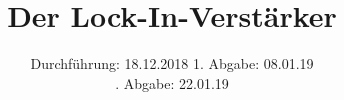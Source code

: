 

\subject{V303}
\title{Der Lock-In-Verstärker}
\date{%
  Durchführung: 18.12.2018
  \hspace{3em}
  1. Abgabe: 08.01.19\\
  \hspace{15em}\!\!\!. Abgabe: 22.01.19
}



\maketitle
\thispagestyle{empty}
\tableofcontents
\newpage







\printbibliography{}


